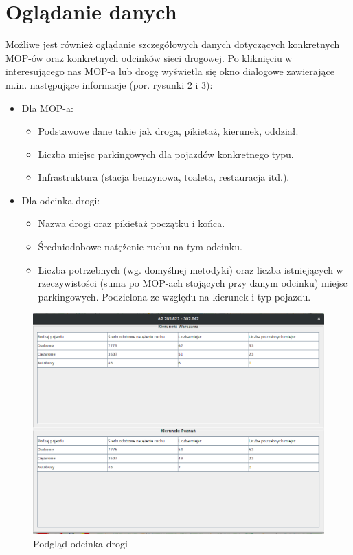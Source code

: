 \documentclass[10pt,paper=a4 BCOR0, DIV15, titlepage=false, oneside]{scrbook} %
\begin{document}
        \section{Oglądanie danych}
      Możliwe jest również oglądanie szczegółowych danych dotyczących
      konkretnych MOP-ów oraz konkretnych odcinków sieci drogowej. Po
      kliknięciu w interesującego nas MOP-a lub drogę wyświetla się okno
      dialogowe zawierające m.in. następujące informacje (por. rysunki 2 i 3):
      \begin{itemize}
        \item Dla MOP-a:
          \begin{itemize}
            \item Podstawowe dane takie jak droga, pikietaż, kierunek, oddział.
            \item Liczba miejsc parkingowych dla pojazdów konkretnego typu.
            \item Infrastruktura (stacja benzynowa, toaleta, restauracja itd.).
          \end{itemize}
        \item Dla odcinka drogi:
          \begin{itemize}
            \item Nazwa drogi oraz pikietaż początku i końca.
            \item Średniodobowe natężenie ruchu na tym odcinku.
            \item Liczba potrzebnych (wg. domyślnej metodyki) oraz liczba
              istniejących w rzeczywistości (suma po MOP-ach stojących przy
              danym odcinku) miejsc parkingowych. Podzielona ze względu na
              kierunek i typ pojazdu.
          \end{itemize}
      \end{itemize}
      \begin{figure}[ht]
        \centering
       \includegraphics[width=.8\textwidth]{podglad_drogi.png}
        \caption{Podgląd odcinka drogi}
      \end{figure}
\end{document}
